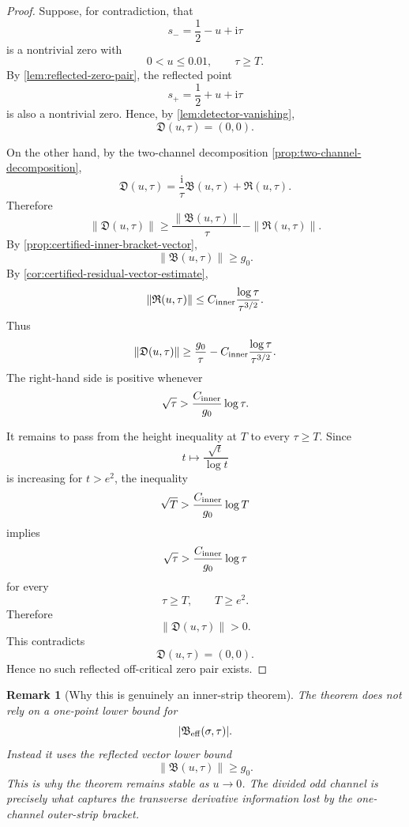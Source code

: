 \documentclass[11pt]{article}
\newtheorem{remark}[theorem]{Remark}
\newcommand{\ii}{\mathrm{i}}
\newcommand{\Beff}{\mathfrak B_{\rm eff}}
\newcommand{\Dvec}{\mathfrak D}
\newcommand{\Bvec}{\mathfrak B}
\newcommand{\Rvec}{\mathfrak R}
\newcommand{\gev}{g_0}
\newcommand{\Cinner}{C_{\rm inner}}
\begin{document}
\begin{proof}
Suppose, for contradiction, that
\[
        s_-=\frac12-u+\ii\tau
\]
is a nontrivial zero with
\[
        0<u\le0.01,
        \qquad
        \tau\ge T.
\]
By \cref{lem:reflected-zero-pair}, the reflected point
\[
        s_+=\frac12+u+\ii\tau
\]
is also a nontrivial zero.  Hence, by \cref{lem:detector-vanishing},
\[
        \Dvec(u,\tau)=(0,0).
\]

On the other hand, by the two-channel decomposition
\cref{prop:two-channel-decomposition},
\[
        \Dvec(u,\tau)
        =
        \frac{\ii}{\tau}\Bvec(u,\tau)
        +
        \Rvec(u,\tau).
\]
Therefore
\[
        \|\Dvec(u,\tau)\|
        \ge
        \frac{\|\Bvec(u,\tau)\|}{\tau}
        -
        \|\Rvec(u,\tau)\|.
\]
By \cref{prop:certified-inner-bracket-vector},
\[
        \|\Bvec(u,\tau)\|\ge \gev.
\]
By \cref{cor:certified-residual-vector-estimate},
\[
        \|\Rvec(u,\tau)\|
        \le
        \Cinner
        \frac{\log\tau}{\tau^{3/2}}.
\]
Thus
\[
        \|\Dvec(u,\tau)\|
        \ge
        \frac{\gev}{\tau}
        -
        \Cinner
        \frac{\log\tau}{\tau^{3/2}}.
\]
The right-hand side is positive whenever
\[
        \sqrt{\tau}
        >
        \frac{\Cinner}{\gev}
        \log\tau.
\]

It remains to pass from the height inequality at \(T\) to every
\(\tau\ge T\).  Since
\[
        t\mapsto \frac{\sqrt t}{\log t}
\]
is increasing for \(t>e^2\), the inequality
\[
        \sqrt T
        >
        \frac{\Cinner}{\gev}
        \log T
\]
implies
\[
        \sqrt{\tau}
        >
        \frac{\Cinner}{\gev}
        \log\tau
\]
for every
\[
        \tau\ge T,
        \qquad
        T\ge e^2.
\]
Therefore
\[
        \|\Dvec(u,\tau)\|>0.
\]
This contradicts
\[
        \Dvec(u,\tau)=(0,0).
\]
Hence no such reflected off-critical zero pair exists.
\end{proof}

\begin{remark}[Why this is genuinely an inner-strip theorem]
The theorem does not rely on a one-point lower bound for
\[
        |\Beff(\sigma,\tau)|.
\]
Instead it uses the reflected vector lower bound
\[
        \|\Bvec(u,\tau)\|\ge\gev.
\]
This is why the theorem remains stable as \(u\to0\).  The divided odd channel
is precisely what captures the transverse derivative information lost by the
one-channel outer-strip bracket.
\end{remark}

\end{document}
